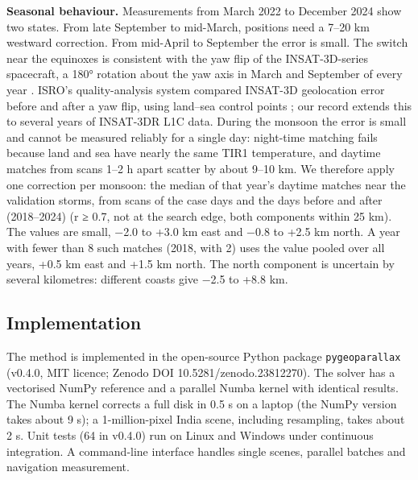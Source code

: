 \textbf{Seasonal behaviour.} Measurements from March 2022 to December 2024 show two states. From late September to mid-March, positions need a 7--20 km westward correction. From mid-April to September the error is small. The switch near the equinoxes is consistent with the yaw flip of the INSAT-3D-series spacecraft, a 180° rotation about the yaw axis in March and September of every year \citep{prakash2014}. ISRO's quality-analysis system compared INSAT-3D geolocation error before and after a yaw flip, using land--sea control points \citep{jindal2014}; our record extends this to several years of INSAT-3DR L1C data. During the monsoon the error is small and cannot be measured reliably for a single day: night-time matching fails because land and sea have nearly the same TIR1 temperature, and daytime matches from scans 1--2 h apart scatter by about 9--10 km. We therefore apply one correction per monsoon: the median of that year's daytime matches near the validation storms, from scans of the case days and the days before and after (2018--2024) (r ≥ 0.7, not at the search edge, both components within 25 km). The values are small, −2.0 to +3.0 km east and −0.8 to +2.5 km north. A year with fewer than 8 such matches (2018, with 2) uses the value pooled over all years, +0.5 km east and +1.5 km north. The north component is uncertain by several kilometres: different coasts give −2.5 to +8.8 km.

\subsection{Implementation}\label{sec:3.7}

The method is implemented in the open-source Python package \texttt{pygeoparallax} (v0.4.0, MIT licence; Zenodo DOI 10.5281/zenodo.23812270). The solver has a vectorised NumPy reference and a parallel Numba kernel \citep{lam2015} with identical results. The Numba kernel corrects a full disk in 0.5 s on a laptop (the NumPy version takes about 9 s); a 1-million-pixel India scene, including resampling, takes about 2 s. Unit tests (64 in v0.4.0) run on Linux and Windows under continuous integration. A command-line interface handles single scenes, parallel batches and navigation measurement.

